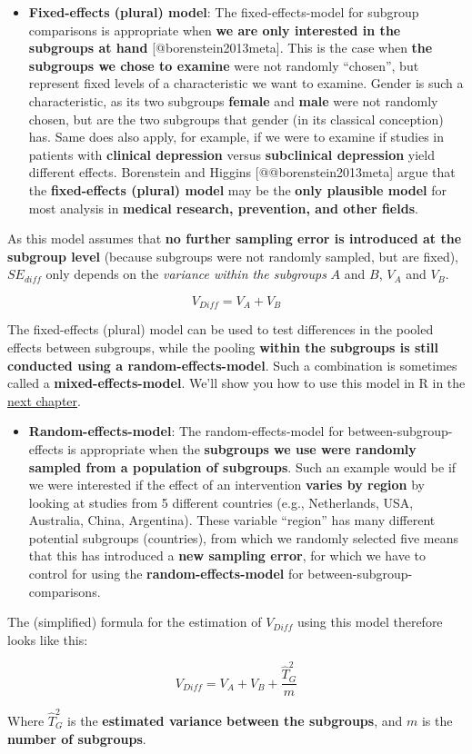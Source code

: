 \documentclass[]{book}
\providecommand{\tightlist}{%
  \setlength{\itemsep}{0pt}\setlength{\parskip}{0pt}}
\theoremstyle{definition}
\theoremstyle{definition}
\theoremstyle{definition}
\theoremstyle{remark}
\begin{document}
\begin{rmdinfo}
\begin{itemize}
\tightlist
\item
  \textbf{Fixed-effects (plural) model}: The fixed-effects-model for
  subgroup comparisons is appropriate when \textbf{we are only
  interested in the subgroups at hand} {[}@borenstein2013meta{]}. This
  is the case when \textbf{the subgroups we chose to examine} were not
  randomly ``chosen'', but represent fixed levels of a characteristic we
  want to examine. Gender is such a characteristic, as its two subgroups
  \textbf{female} and \textbf{male} were not randomly chosen, but are
  the two subgroups that gender (in its classical conception) has. Same
  does also apply, for example, if we were to examine if studies in
  patients with \textbf{clinical depression} versus \textbf{subclinical
  depression} yield different effects. Borenstein and Higgins
  {[}@@borenstein2013meta{]} argue that the \textbf{fixed-effects
  (plural) model} may be the \textbf{only plausible model} for most
  analysis in \textbf{medical research, prevention, and other fields}.
\end{itemize}

As this model assumes that \textbf{no further sampling error is
introduced at the subgroup level} (because subgroups were not randomly
sampled, but are fixed), \(SE_{diff}\) only depends on the
\emph{variance within the subgroups} \(A\) and \(B\), \(V_A\) and
\(V_B\).

\[V_{Diff}=V_A + V_B\]

The fixed-effects (plural) model can be used to test differences in the
pooled effects between subgroups, while the pooling \textbf{within the
subgroups is still conducted using a random-effects-model}. Such a
combination is sometimes called a \textbf{mixed-effects-model}. We'll
show you how to use this model in R in the
\protect\hyperlink{mixed}{next chapter}.

\begin{itemize}
\tightlist
\item
  \textbf{Random-effects-model}: The random-effects-model for
  between-subgroup-effects is appropriate when the \textbf{subgroups we
  use were randomly sampled from a population of subgroups}. Such an
  example would be if we were interested if the effect of an
  intervention \textbf{varies by region} by looking at studies from 5
  different countries (e.g., Netherlands, USA, Australia, China,
  Argentina). These variable ``region'' has many different potential
  subgroups (countries), from which we randomly selected five means that
  this has introduced a \textbf{new sampling error}, for which we have
  to control for using the \textbf{random-effects-model} for
  between-subgroup-comparisons.
\end{itemize}

The (simplified) formula for the estimation of \(V_{Diff}\) using this
model therefore looks like this:

\[V_{Diff}=V_A + V_B + \frac{\hat T^2_G}{m} \]

Where \(\hat T^2_G\) is the \textbf{estimated variance between the
subgroups}, and \(m\) is the \textbf{number of subgroups}.
\end{rmdinfo}
\end{document}
